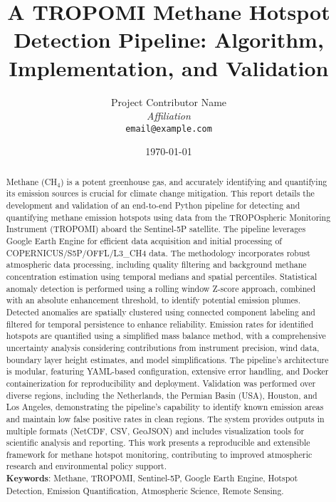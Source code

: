 \documentclass[12pt,a4paper]{article}
\title{A TROPOMI Methane Hotspot Detection Pipeline: Algorithm, Implementation, and Validation}
\author{
    Project Contributor Name \\
    \textit{Affiliation} \\
    \texttt{email@example.com}
}
\date{\today}
\begin{document}
\maketitle
\begin{abstract}
Methane (CH$_4$) is a potent greenhouse gas, and accurately identifying and quantifying its emission sources is crucial for climate change mitigation. This report details the development and validation of an end-to-end Python pipeline for detecting and quantifying methane emission hotspots using data from the TROPOspheric Monitoring Instrument (TROPOMI) aboard the Sentinel-5P satellite. The pipeline leverages Google Earth Engine for efficient data acquisition and initial processing of COPERNICUS/S5P/OFFL/L3\_CH4 data. The methodology incorporates robust atmospheric data processing, including quality filtering and background methane concentration estimation using temporal medians and spatial percentiles. Statistical anomaly detection is performed using a rolling window Z-score approach, combined with an absolute enhancement threshold, to identify potential emission plumes. Detected anomalies are spatially clustered using connected component labeling and filtered for temporal persistence to enhance reliability. Emission rates for identified hotspots are quantified using a simplified mass balance method, with a comprehensive uncertainty analysis considering contributions from instrument precision, wind data, boundary layer height estimates, and model simplifications. The pipeline's architecture is modular, featuring YAML-based configuration, extensive error handling, and Docker containerization for reproducibility and deployment. Validation was performed over diverse regions, including the Netherlands, the Permian Basin (USA), Houston, and Los Angeles, demonstrating the pipeline's capability to identify known emission areas and maintain low false positive rates in clean regions. The system provides outputs in multiple formats (NetCDF, CSV, GeoJSON) and includes visualization tools for scientific analysis and reporting. This work presents a reproducible and extensible framework for methane hotspot monitoring, contributing to improved atmospheric research and environmental policy support.
\\
\textbf{Keywords}: Methane, TROPOMI, Sentinel-5P, Google Earth Engine, Hotspot Detection, Emission Quantification, Atmospheric Science, Remote Sensing.
\end{abstract}

\clearpage
\tableofcontents
\clearpage
\end{document}
